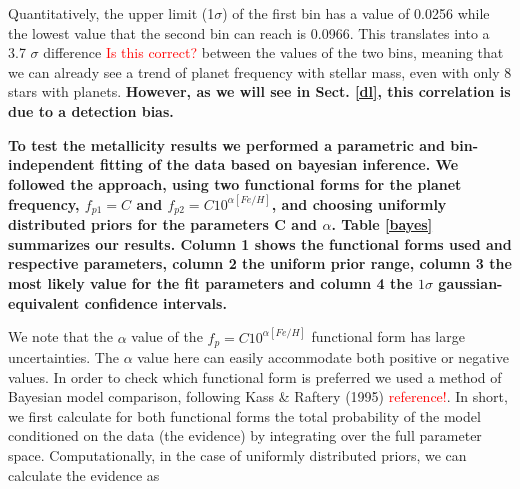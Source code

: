 \documentclass[structabstract]{aa}
\begin{document}
Quantitatively, the upper limit (1$\sigma$) of the first bin has a value of 0.0256 while the lowest value that the second bin can reach is 0.0966. This translates into a 3.7 $\sigma$ difference \textcolor{red}{Is this correct?} between the values of the two bins, meaning that we can already see a trend of planet frequency with stellar mass, even with only 8 stars with planets. \textbf{However, as we will see in Sect. \ref{dl}, this correlation is due to a detection bias.}


\textbf{To test the metallicity results we performed a parametric and bin-independent fitting of the data based on bayesian inference. We followed the \citet{Johnson-2010} approach, using two functional forms for the planet frequency, $f_{p1} = C$ and $f_{p2} = C10^{\alpha [Fe/H]}$, and choosing uniformly distributed priors for the parameters C and $\alpha$. Table \ref{bayes} summarizes our results. Column 1 shows the functional forms used and respective parameters, column 2 the uniform prior range, column 3 the most likely value for the fit parameters and column 4 the $1\sigma$ gaussian-equivalent confidence intervals.} 

\begin{table}[h]
\centering
\caption{Parameters of the two bayesian models. \textcolor{red}{To be updated!}}
\label{bayes}
\begin{center}
\end{center}
\end{table}

We note that the $\alpha$ value of the $f_{p} = C10^{\alpha [Fe/H]}$ functional form has large uncertainties. The $\alpha$ value here can easily accommodate both positive or negative values. In order to check which functional form is preferred we used a method of Bayesian model comparison, following Kass \& Raftery (1995) \textcolor{red}{reference!}. In short, we first calculate for both functional forms the total probability of the model conditioned on the data (the evidence) by integrating over the full parameter space. Computationally, in the case of uniformly distributed priors, we can calculate the evidence as  
\end{document}
